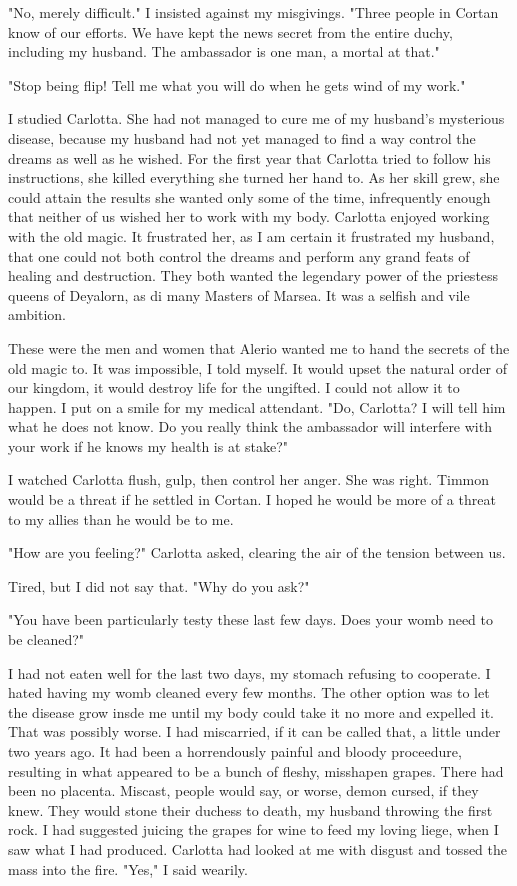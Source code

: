 \documentclass{article}
\begin{document}
"No, merely difficult." I insisted against my misgivings. "Three people in Cortan know of our efforts. We have kept the news secret from the entire duchy, including my husband. The ambassador is one man, a mortal at that."

"Stop being flip! Tell me what you will do when he gets wind of my work."

I studied Carlotta. She had not managed to cure me of my husband's mysterious disease, because my husband had not yet managed to find a way control the dreams as well as he wished. For the first year that Carlotta tried to follow his instructions, she killed everything she turned her hand to. As her skill grew, she could attain the results she wanted only some of the time, infrequently enough that neither of us wished her to work with my body. Carlotta enjoyed working with the old magic. It frustrated her, as I am certain it frustrated my husband, that one could not both control the dreams and perform any grand feats of healing and destruction. They both wanted the legendary power of the priestess queens of Deyalorn, as di many Masters of Marsea. It was a selfish and vile ambition.

These were the men and women that Alerio wanted me to hand the secrets of the old magic to. It was impossible, I told myself. It would upset the natural order of our kingdom, it would destroy life for the ungifted. I could not allow it to happen. I put on a smile for my medical attendant. "Do, Carlotta? I will tell him what he does not know. Do you really think the ambassador will interfere with your work if he knows my health is at stake?"

I watched Carlotta flush, gulp, then control her anger. She was right. Timmon would be a threat if he settled in Cortan. I hoped he would be more of a threat to my allies than he would be to me.

"How are you feeling?" Carlotta asked, clearing the air of the tension between us.

Tired, but I did not say that. "Why do you ask?"

"You have been particularly testy these last few days. Does your womb need to be cleaned?"

I had not eaten well for the last two days, my stomach refusing to cooperate. I hated having my womb cleaned every few months. The other option was to let the disease grow insde me until my body could take it no more and expelled it. That was possibly worse. I had miscarried, if it can be called that, a little under two years ago. It had been a horrendously painful and bloody proceedure, resulting in what appeared to be a bunch of fleshy, misshapen grapes. There had been no placenta. Miscast, people would say, or worse, demon cursed, if they knew. They would stone their duchess to death, my husband throwing the first rock. I had suggested juicing the grapes for wine to feed my loving liege, when I saw what I had produced. Carlotta had looked at me with disgust and tossed the mass into the fire. "Yes," I said wearily.
\end{document}
